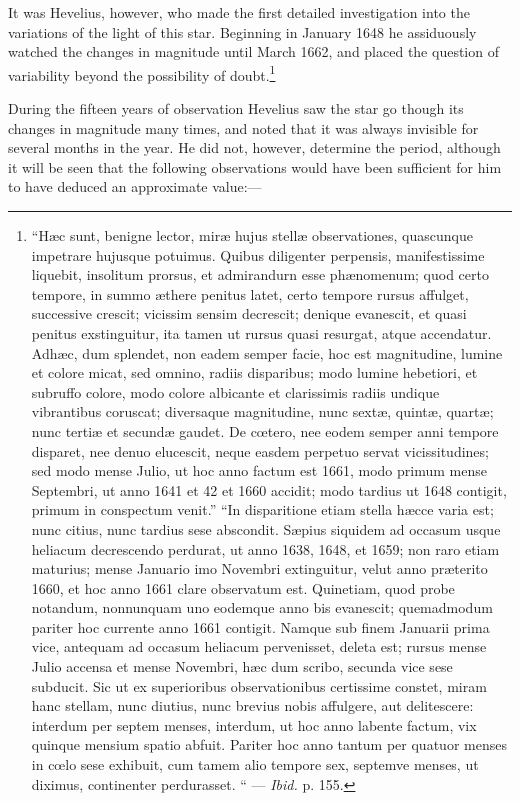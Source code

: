 \documentclass[a4paper, 12pt, oneside, polutonikogreek, english]{article}
\begin{document}
It was Hevelius, however, who made the first detailed investigation into the variations of the light of this star. Beginning in January 1648 he assiduously watched the changes in magnitude until March 1662, and placed the question of variability beyond the possibility of doubt.\footnote{``Hæc sunt, benigne lector, miræ hujus stellæ observationes, quascunque impetrare hujusque potuimus. Quibus diligenter perpensis, manifestissime liquebit, insolitum prorsus, et admirandurn esse phænomenum; quod certo tempore, in summo æthere penitus latet, certo tempore rursus affulget, successive crescit; vicissim sensim decrescit; denique evanescit, et quasi penitus exstinguitur, ita tamen ut rursus quasi resurgat, atque accendatur. Adhæc, dum splendet, non eadem semper facie, hoc est magnitudine, lumine et colore micat, sed omnino, radiis disparibus; modo lumine hebetiori, et subruffo colore, modo colore albicante et clarissimis radiis undique vibrantibus coruscat; diversaque magnitudine, nunc sextæ, quintæ, quartæ; nunc tertiæ et secundæ gaudet. De cœtero, nee eodem semper anni tempore disparet, nee denuo elucescit, neque easdem perpetuo servat vicissitudines; sed modo mense Julio, ut hoc anno factum est 1661, modo primum mense Septembri, ut anno 1641 et 42 et 1660 accidit; modo tardius ut 1648 contigit, primum in conspectum venit.'' ``In disparitione etiam stella hæcce varia est; nunc citius, nunc tardius sese abscondit. Sæpius siquidem ad occasum usque heliacum decrescendo perdurat, ut anno 1638, 1648, et 1659; non raro etiam maturius; mense Januario imo Novembri extinguitur, velut anno præterito 1660, et hoc anno 1661 clare observatum est. Quinetiam, quod probe notandum, nonnunquam uno eodemque anno bis evanescit; quemadmodum pariter hoc currente anno 1661 contigit. Namque sub finem Januarii prima vice, antequam ad occasum heliacum pervenisset, deleta est; rursus mense Julio accensa et mense Novembri, hæc dum scribo, secunda vice sese subducit. Sic ut ex superioribus observationibus certissime constet, miram hanc stellam, nunc diutius, nunc brevius nobis affulgere, aut delitescere: interdum per septem menses, interdum, ut hoc anno labente factum, vix quinque mensium spatio abfuit. Pariter hoc anno tantum per quatuor menses in cœlo sese exhibuit, cum tamem alio tempore sex, septemve menses, ut diximus, continenter perdurasset. `` --- \emph{Ibid.} p. 155.}

During the fifteen years of observation Hevelius saw the star go though its changes in magnitude many times, and noted that it was always invisible for several months in the year. He did not, however, determine the period, although it will be seen that the following observations would have been sufficient for him to have deduced an approximate value:---
\end{document}
